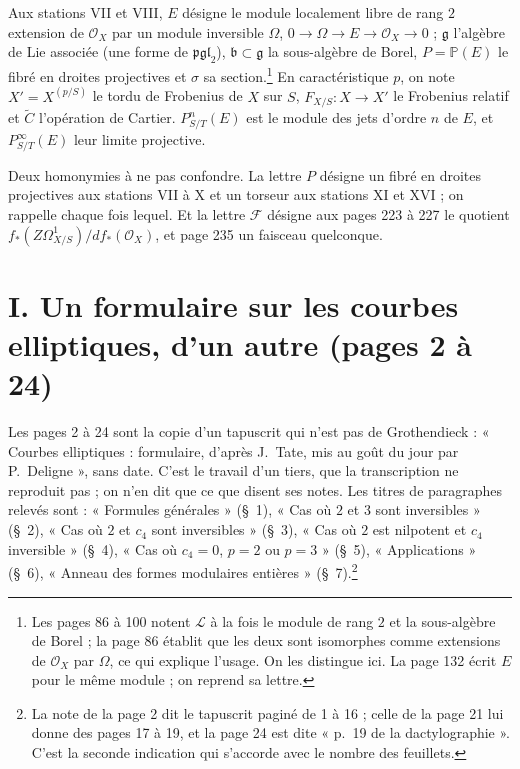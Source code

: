 \documentclass[11pt,a4paper]{article}
\begin{document}
Aux stations VII et VIII, $E$ désigne le module localement libre de rang $2$
extension de $\mathcal{O}_X$ par un module inversible $\Omega$,
$0 \to \Omega \to E \to \mathcal{O}_X \to 0$ ; $\mathfrak{g}$ l'algèbre de Lie
associée (une forme de $\mathfrak{pgl}_2$), $\mathfrak{b} \subset \mathfrak{g}$
la sous-algèbre de Borel, $P = \mathbb{P}(E)$ le fibré en droites projectives
et $\sigma$ sa section.\footnote{Les pages 86 à 100 notent $\mathcal{L}$ à la
fois le module de rang $2$ et la sous-algèbre de Borel ; la page 86 établit
que les deux sont isomorphes comme extensions de $\mathcal{O}_X$ par
$\Omega$, ce qui explique l'usage. On les distingue ici. La page 132 écrit
$E$ pour le même module ; on reprend sa lettre.} En caractéristique $p$, on
note $X' = X^{(p/S)}$ le tordu de Frobenius de $X$ sur $S$,
$F_{X/S} : X \to X'$ le Frobenius relatif et $\widetilde{C}$ l'opération de
Cartier. $P^n_{S/T}(E)$ est le module des jets d'ordre $n$ de $E$, et
$P^\infty_{S/T}(E)$ leur limite projective.

Deux homonymies à ne pas confondre. La lettre $P$ désigne un fibré en
droites projectives aux stations VII à X et un torseur aux stations XI et
XVI ; on rappelle chaque fois lequel. Et la lettre $\mathcal{F}$ désigne aux
pages 223 à 227 le quotient $f_*(Z\Omega^1_{X/S})/d f_*(\mathcal{O}_X)$, et
page 235 un faisceau quelconque.

\section*{I. Un formulaire sur les courbes elliptiques, d'un autre (pages 2 à 24)}

Les pages 2 à 24 sont la copie d'un tapuscrit qui n'est pas de Grothendieck :
« Courbes elliptiques : formulaire, d'après J.~Tate, mis au goût du jour par
P.~Deligne », sans date. C'est le travail d'un tiers, que la transcription ne
reproduit pas ; on n'en dit que ce que disent ses notes. Les titres de
paragraphes relevés sont : « Formules générales » (§~1), « Cas où $2$ et $3$
sont inversibles » (§~2), « Cas où $2$ et $c_4$ sont inversibles » (§~3), « Cas
où $2$ est nilpotent et $c_4$ inversible » (§~4), « Cas où $c_4 = 0$, $p = 2$ ou
$p = 3$ » (§~5), « Applications » (§~6), « Anneau des formes modulaires
entières » (§~7).\footnote{La note de la page 2 dit le tapuscrit paginé de 1
à 16 ; celle de la page 21 lui donne des pages 17 à 19, et la page 24 est
dite « p.~19 de la dactylographie ». C'est la seconde indication qui
s'accorde avec le nombre des feuillets.}
\end{document}
